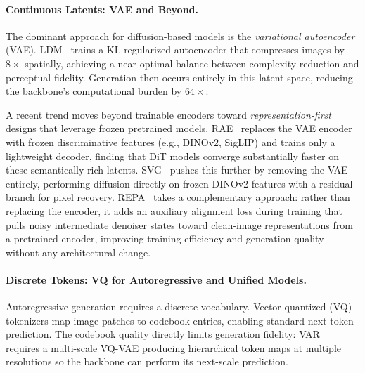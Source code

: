 \paragraph{Continuous Latents: VAE and Beyond.}
The dominant approach for diffusion-based models is the \emph{variational autoencoder} (VAE). LDM~\citep{rombach2022stablediffusion} trains a KL-regularized autoencoder that compresses images by $8\times$ spatially, achieving a near-optimal balance between complexity reduction and perceptual fidelity. Generation then occurs entirely in this latent space, reducing the backbone's computational burden by $64\times$.

A recent trend moves beyond trainable encoders toward \emph{representation-first} designs that leverage frozen pretrained models. RAE~\citep{zheng2025rae} replaces the VAE encoder with frozen discriminative features (e.g., DINOv2, SigLIP) and trains only a lightweight decoder, finding that DiT models converge substantially faster on these semantically rich latents. SVG~\citep{shi2025svg} pushes this further by removing the VAE entirely, performing diffusion directly on frozen DINOv2 features with a residual branch for pixel recovery. REPA~\citep{yu2024representation} takes a complementary approach: rather than replacing the encoder, it adds an auxiliary alignment loss during training that pulls noisy intermediate denoiser states toward clean-image representations from a pretrained encoder, improving training efficiency and generation quality without any architectural change.

\paragraph{Discrete Tokens: VQ for Autoregressive and Unified Models.}
Autoregressive generation requires a discrete vocabulary. Vector-quantized (VQ) tokenizers map image patches to codebook entries, enabling standard next-token prediction. The codebook quality directly limits generation fidelity: VAR~\citep{tian2024visual} requires a multi-scale VQ-VAE producing hierarchical token maps at multiple resolutions so the backbone can perform its next-scale prediction.

